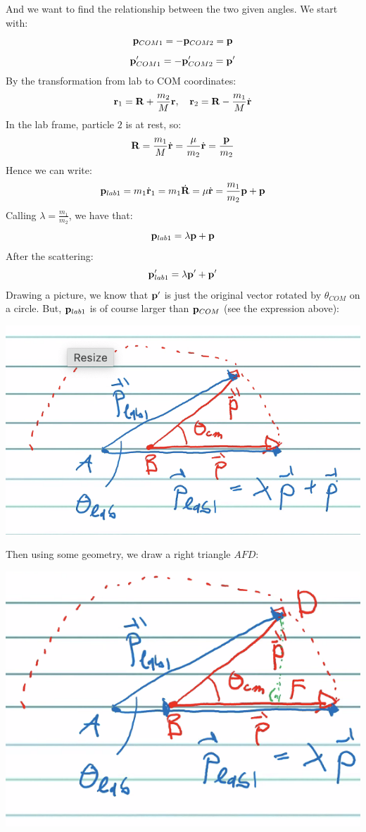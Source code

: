 And we want to find the relationship between the two given angles. We start with:
\[\mathbf{p}_{COM1} = -\mathbf{p}_{COM2} = \mathbf{p}\]
\[\mathbf{p}'_{COM1} = -\mathbf{p}'_{COM2} = \mathbf{p}'\]
By the transformation from lab to COM coordinates:
\[\mathbf{r}_1 = \mathbf{R} + \frac{m_2}{M}\mathbf{r}, \quad \mathbf{r}_2 = \mathbf{R} - \frac{m_1}{M}\dot{\mathbf{r}}\]
In the lab frame, particle $2$ is at rest, so:
\[\mathbf{R} = \frac{m_1}{M}\dot{\mathbf{r}} = \frac{\mu}{m_2}\dot{\mathbf{r}} = \frac{\mathbf{p}}{m_2} \]
Hence we can write:
\[\mathbf{p}_{lab1} = m_1\dot{\mathbf{r}}_1 = m_1\dot{\mathbf{R}} = \mu\dot{\mathbf{r}} = \frac{m_1}{m_2}\mathbf{p} + \mathbf{p}\]
Calling $\lambda = \frac{m_1}{m_2}$, we have that:
\[\mathbf{p}_{lab1} = \lambda\mathbf{p} + \mathbf{p}\]
After the scattering:
\[\mathbf{p}'_{lab1} = \lambda\mathbf{p}' + \mathbf{p}'\]
Drawing a picture, we know that $\mathbf{p}'$ is just the original vector rotated by $\theta_{COM}$ on a circle. But, $\mathbf{p}_{lab1}$ is of course larger than $\mathbf{p}_{COM}$ (see the expression above):
\begin{center}
    \includegraphics[scale=0.5]{Lecture-29/l29-img4.png}
\end{center}
Then using some geometry, we draw a right triangle $AFD$:
\begin{center}
    \includegraphics[scale=0.5]{Lecture-29/l29-img5.png}
\end{center}
